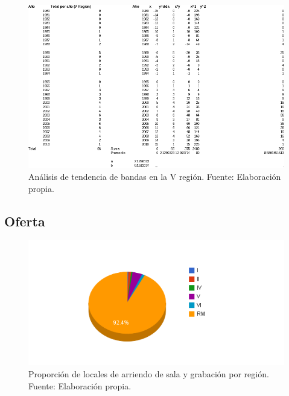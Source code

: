 \begin{figure}[h!]
    \centering
    \includegraphics[scale=0.75, angle=-90]{img/demanda4.png}
  \caption[Análisis de tendencia de bandas en la V región]{Análisis de
  tendencia de bandas en la V región. Fuente: Elaboración propia.}
\end{figure}
\newpage
\subsection{Oferta}
\begin{figure}[h!]
    \centering
    \includegraphics[]{img/oferta1.png}
  \caption[Proporción de locales de arriendo de sala y grabación por
  región]{Proporción de locales de arriendo de sala y grabación por región.
  Fuente: Elaboración propia.}
\end{figure}
